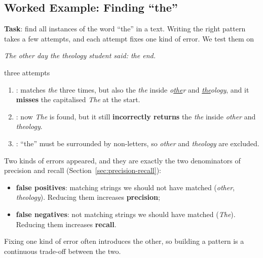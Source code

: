 \subsection{Worked Example: Finding ``the''}
\label{sec:regex-example}

\textbf{Task}: find all instances of the word ``the'' in a text. Writing the right pattern
takes a few attempts, and each attempt fixes one kind of error. We test them on
\begin{center}
\emph{The other day the theology student said: the end.}
\end{center}

\begin{nbexample}{three attempts}
\begin{enumerate}
  \item {}: matches \emph{the} three times, but also the \emph{the} inside
        \emph{o\underline{the}r} and \emph{\underline{the}ology}, and it
        \textbf{misses} the capitalised \emph{The} at the start.
  \item {}: now \emph{The} is found, but it still \textbf{incorrectly returns}
        the \emph{the} inside \emph{other} and \emph{theology}.
  \item {}: ``the'' must be
        surrounded by non-letters, so \emph{other} and \emph{theology} are excluded.
\end{enumerate}
\end{nbexample}

Two kinds of errors appeared, and they are exactly the two denominators of precision and
recall (Section~\ref{sec:precision-recall}):
\begin{itemize}[nosep]
  \item \textbf{false positives}: matching strings we should not have matched
        (\emph{other}, \emph{theology}). Reducing them increases \textbf{precision};
  \item \textbf{false negatives}: not matching strings we should have matched
        (\emph{The}). Reducing them increases \textbf{recall}.
\end{itemize}
Fixing one kind of error often introduces the other, so building a pattern is a
continuous trade-off between the two.

